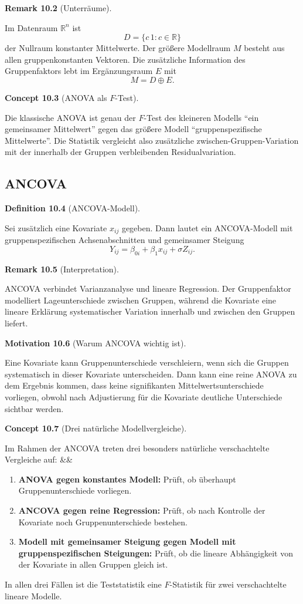 \documentclass[10pt, letterpaper]{article}
\newcommand{\R}{\mathbb{R}}
\newenvironment{romanenum}[1][]
  {%
    \ifx&#1&
    \else
      \textbf{#1}\quad
    \fi
    \begin{enumerate}[label=\roman*)]
  }
  {%
    \end{enumerate}%
  }
\newcommand{\CustomHeading}[3]{%
  \par\medskip\noindent%
  \textbf{#1 #2} \textnormal{(#3)}.\enskip%
}
\newenvironment{DEF}[2]{\CustomHeading{Definition}{#1}{#2}}{}
\newenvironment{REM}[2]{\CustomHeading{Remark}{#1}{#2}}{}
\newenvironment{CONC}[2]{\CustomHeading{Concept}{#1}{#2}}{}
\newenvironment{MOT}[2]{\CustomHeading{Motivation}{#1}{#2}}{}
\begin{document}
\begin{REM}{10.2}{Unterräume}
Im Datenraum \(\R^n\) ist
\[
D=\{c\,1:c\in\R\}
\]
der Nullraum konstanter Mittelwerte. Der größere Modellraum \(M\) besteht aus allen gruppenkonstanten Vektoren. Die zusätzliche Information des Gruppenfaktors lebt im Ergänzungsraum \(E\) mit
\[
M=D\oplus E.
\]
\end{REM}

\begin{CONC}{10.3}{ANOVA als \(F\)-Test}
Die klassische ANOVA ist genau der \(F\)-Test des kleineren Modells ``ein gemeinsamer Mittelwert'' gegen das größere Modell ``gruppenspezifische Mittelwerte''. Die Statistik vergleicht also zusätzliche zwischen-Gruppen-Variation mit der innerhalb der Gruppen verbleibenden Residualvariation.
\end{CONC}

\subsection{ANCOVA}

\begin{DEF}{10.4}{ANCOVA-Modell}
Sei zusätzlich eine Kovariate \(x_{ij}\) gegeben. Dann lautet ein ANCOVA-Modell mit gruppenspezifischen Achsenabschnitten und gemeinsamer Steigung
\[
Y_{ij}=\beta_{0i}+\beta_1 x_{ij}+\sigma Z_{ij}.
\]
\end{DEF}

\begin{REM}{10.5}{Interpretation}
ANCOVA verbindet Varianzanalyse und lineare Regression. Der Gruppenfaktor modelliert Lageunterschiede zwischen Gruppen, während die Kovariate eine lineare Erklärung systematischer Variation innerhalb und zwischen den Gruppen liefert.
\end{REM}

\begin{MOT}{10.6}{Warum ANCOVA wichtig ist}
Eine Kovariate kann Gruppenunterschiede verschleiern, wenn sich die Gruppen systematisch in dieser Kovariate unterscheiden. Dann kann eine reine ANOVA zu dem Ergebnis kommen, dass keine signifikanten Mittelwertsunterschiede vorliegen, obwohl nach Adjustierung für die Kovariate deutliche Unterschiede sichtbar werden.
\end{MOT}

\begin{CONC}{10.7}{Drei natürliche Modellvergleiche}
Im Rahmen der ANCOVA treten drei besonders natürliche verschachtelte Vergleiche auf:
\begin{romanenum}
    \item \textbf{ANOVA gegen konstantes Modell:}
    Prüft, ob überhaupt Gruppenunterschiede vorliegen.
    \item \textbf{ANCOVA gegen reine Regression:}
    Prüft, ob nach Kontrolle der Kovariate noch Gruppenunterschiede bestehen.
    \item \textbf{Modell mit gemeinsamer Steigung gegen Modell mit gruppenspezifischen Steigungen:}
    Prüft, ob die lineare Abhängigkeit von der Kovariate in allen Gruppen gleich ist.
\end{romanenum}
In allen drei Fällen ist die Teststatistik eine \(F\)-Statistik für zwei verschachtelte lineare Modelle.
\end{CONC}
\end{document}
